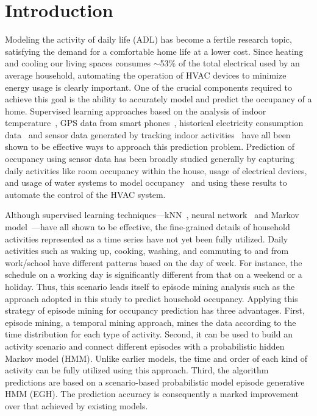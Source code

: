 \section{Introduction}

Modeling the activity of daily life (ADL) has become a fertile research topic, 
satisfying the demand for a comfortable home life
at a lower cost. 
Since heating and cooling our living spaces consumes $\sim$53\% of the total electrical used
by an average household, 
automating the operation of HVAC devices to minimize energy usage is clearly important. 
One of the crucial components required to achieve this goal is the ability
to accurately model and predict the occupancy of a home. 
Supervised learning approaches based on the analysis of indoor temperature~\cite{kleiminger2014predicting}, 
GPS data from smart phones~\cite{koehler2013therml}, 
historical electricity consumption data~\cite{erickson2010occupancy} and 
sensor data generated by tracking indoor activities~\cite{scott2011preheat,alrazgan2011learning} 
have all been shown to be effective ways to approach this prediction problem. 
Prediction of occupancy using sensor data has been broadly studied 
generally by capturing daily activities like room occupancy within the house, 
usage of electrical devices, 
and usage of water systems to model occupancy~\cite{mahmoud2013behavioural,erickson2010occupancy,beltran2014optimal} 
and using these results to automate the control of the HVAC system. 

Although supervised learning techniques---kNN~\cite{scott2011preheat}, 
neural network~\cite{mahmoud2013behavioural} and Markov model~\cite{erickson2010occupancy}---have all shown to be effective, 
the fine-grained details of household activities represented as a time series have not yet been fully utilized. 
Daily activities such as waking up, cooking, washing, and commuting to and from work/school
have different patterns based on the day of week. 
For instance, the schedule on a working day is significantly different from that on a weekend 
or a holiday. 
Thus, this scenario leads itself to episode mining analysis such as the approach adopted in this study
to predict household occupancy. 
Applying this strategy of episode mining for occupancy prediction has three advantages. 
First, episode mining, a temporal mining approach, mines the data according to the time 
distribution for each type of activity. 
Second, it can be used to build an activity scenario and connect different episodes with 
a probabilistic hidden Markov model (HMM). 
Unlike earlier models, 
the time and order of each kind of activity can be fully utilized using this approach.
Third, the algorithm predictions are based on a scenario-based probabilistic model episode 
generative HMM (EGH). The prediction accuracy is consequently a marked improvement over that achieved by existing models. 

